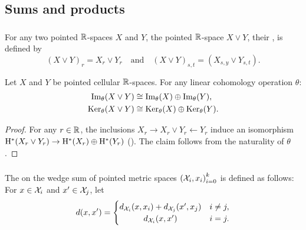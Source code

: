 
\subsection{Sums and products}

\subsubsection{}

For any two pointed $\mathbb{R}$-spaces $X$ and $Y$, the pointed $\mathbb{R}$-space $X \vee Y$, their , is defined by
\[
(X \vee Y)_r = X_r \vee Y_r \quad\text{and}\quad (X \vee Y)_{s,t} = (X_{s,y} \vee Y_{s,t}).
\]

\medskip\theorem
Let $X$ and $Y$ be pointed cellular $\mathbb{R}$-spaces.
For any linear cohomology operation $\theta$:
\begin{align*}
	\operatorname{Im}_\theta(X \vee Y) &\cong \operatorname{Im}_\theta(X) \oplus \operatorname{Im}_\theta(Y), \\
	\operatorname{Ker}_\theta(X \vee Y) &\cong \operatorname{Ker}_\theta(X) \oplus \operatorname{Ker}_\theta(Y).
\end{align*}

\begin{proof}
	For any \(r \in \mathbb{R}\), the inclusions $X_r \to X_r \vee Y_r \leftarrow Y_r$ induce an isomorphism $\mathrm{H}^*(X_r \vee Y_r) \to \mathrm{H}^*(X_r) \oplus \mathrm{H}^*(Y_r)$ (\cite[Corollary 2.25.]{hatcher2000}).
	The claim follows from the naturality of \(\theta\).
\end{proof}

\subsubsection{}\label{ss:wedge sum}

The  on the wedge sum of pointed metric spaces ${(\mathcal{X}_i, x_i)}_{i = 0}^k$ is defined as follows: For $x \in \mathcal{X}_i$ and $x' \in \mathcal{X}_j$, let
\[
d(x, x') =
\begin{cases}
	d_{\cX_i}(x, x_i) + d_{\cX_j}(x', x_j) & i \neq j, \\
	\hfil d_{\cX_i}(x, x') & i = j.
\end{cases}
\]

